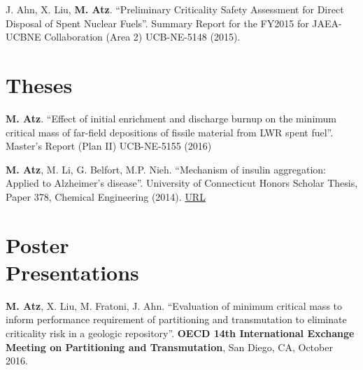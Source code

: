 \documentclass[margin,line]{resume}
\begin{document}
\begin{resume}
\begin{bibenum}
    \item J. Ahn, X. Liu, \textbf{M. Atz}. ``Preliminary Criticality Safety Assessment for Direct Disposal of Spent Nuclear Fuels''. Summary Report for the FY2015 for JAEA-UCBNE Collaboration (Area 2) UCB-NE-5148 (2015).

\end{bibenum}


\section{\mysidestyle Theses\\}
\begin{bibenum}

    \item \textbf{M. Atz}. ``Effect of initial enrichment and discharge burnup on the minimum critical mass of far-field depositions of fissile material from LWR spent fuel''. Master’s Report (Plan II) UCB-NE-5155 (2016)

    \item \textbf{M. Atz}, M. Li, G. Belfort, M.P. Nieh. ``Mechanism of insulin aggregation: Applied to Alzheimer’s disease''. University of Connecticut Honors Scholar Thesis, Paper 378, Chemical Engineering (2014). \href{https://opencommons.uconn.edu/cgi/viewcontent.cgi?referer=&httpsredir=1&article=1386&context=srhonors_theses}{URL} 
    

\end{bibenum}


\section{\mysidestyle Poster\\Presentations}
\begin{bibenum}

    \item \textbf{M. Atz}, X. Liu, M. Fratoni, J. Ahn. ``Evaluation of minimum critical mass to inform performance requirement of partitioning and transmutation to eliminate criticality risk in a geologic repository''. \textbf{OECD 14th International Exchange Meeting on Partitioning and Transmutation}, San Diego, CA, October 2016.
    

\end{bibenum}
\end{resume}
\end{document}
